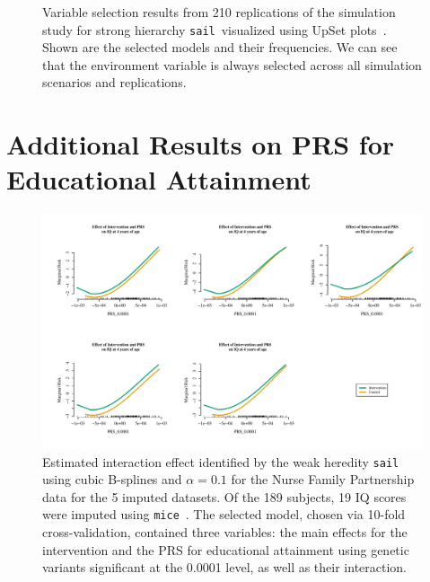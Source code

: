 \documentclass[a4paper,fleqn]{cas-sc}
\newcommand{\sail}{\texttt{sail}}
\begin{document}
\begin{figure}[h]
	\caption{Variable selection results from 210 replications of the simulation study for strong hierarchy \sail ~visualized using UpSet plots~\citep{upsetR}. Shown are the selected models and their frequencies. We can see that the environment variable is always selected across all simulation scenarios and replications. }
	\label{fig:upset-results}
\end{figure}







\FloatBarrier


\section{Additional Results on PRS for Educational Attainment} \label{ap:prseduc}

\begin{figure}[h]
		
		{\centering \includegraphics[width=1\linewidth]{figure/PRS-intervention-interaction-others-1} 
			
		}
		
		\caption{Estimated interaction effect identified by the weak heredity \texttt{sail} using cubic B-splines and $\alpha=0.1$ for the Nurse Family Partnership data for the 5 imputed datasets. Of the 189 subjects, 19 IQ scores were imputed using \texttt{mice}~\citep{buuren2010mice}. The selected model, chosen via 10-fold cross-validation, contained three variables: the main effects for the intervention and the PRS for educational attainment using genetic variants significant at the 0.0001 level, as well as their interaction.}\label{fig:PRS-intervention-interaction-others}
\end{figure}
	
\end{document}
